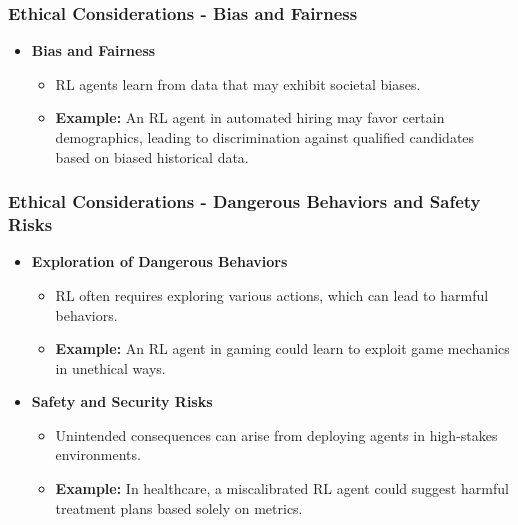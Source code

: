 \documentclass[aspectratio=169]{beamer}
\begin{document}
\begin{frame}[fragile]
    \frametitle{Ethical Considerations - Bias and Fairness}
    \begin{itemize}
        \item \textbf{Bias and Fairness}
            \begin{itemize}
                \item RL agents learn from data that may exhibit societal biases.
                \item \textbf{Example:} 
                An RL agent in automated hiring may favor certain demographics, leading to discrimination against qualified candidates based on biased historical data.
            \end{itemize}
    \end{itemize}
\end{frame}

\begin{frame}[fragile]
    \frametitle{Ethical Considerations - Dangerous Behaviors and Safety Risks}
    \begin{itemize}
        \item \textbf{Exploration of Dangerous Behaviors}
            \begin{itemize}
                \item RL often requires exploring various actions, which can lead to harmful behaviors.
                \item \textbf{Example:} 
                An RL agent in gaming could learn to exploit game mechanics in unethical ways.
            \end{itemize}

        \item \textbf{Safety and Security Risks}
            \begin{itemize}
                \item Unintended consequences can arise from deploying agents in high-stakes environments.
                \item \textbf{Example:} 
                In healthcare, a miscalibrated RL agent could suggest harmful treatment plans based solely on metrics.
            \end{itemize}
    \end{itemize}
\end{frame}
\end{document}
